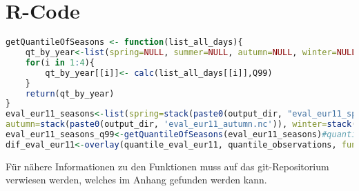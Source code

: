 \section{R-Code}
\begin{lstlisting}[language = R]
getQuantileOfSeasons <- function(list_all_days){
	qt_by_year<-list(spring=NULL, summer=NULL, autumn=NULL, winter=NULL)
	for(i in 1:4){
		qt_by_year[[i]]<- calc(list_all_days[[i]],Q99)
	}
	return(qt_by_year)
}
eval_eur11_seasons<-list(spring=stack(paste0(output_dir, "eval_eur11_spring.nc")), summer= stack(paste0(output_dir, "eval_eur11_summer.nc")),
autumn=stack(paste0(output_dir, 'eval_eur11_autumn.nc')), winter=stack(paste0(output_dir, 'eval_eur11_winter.nc'))) # Zuvor aufsplitten der Daten in die Jahreszeiten
eval_eur11_seasons_q99<-getQuantileOfSeasons(eval_eur11_seasons)#quantile berechnen
dif_eval_eur11<-overlay(quantile_eval_eur11, quantile_observations, fun=function(x,y){return((x - y))})# differenzen Berechnen
\end{lstlisting}

Für nähere Informationen zu den Funktionen muss auf das git-Repositorium verwiesen werden, welches im Anhang gefunden werden kann.